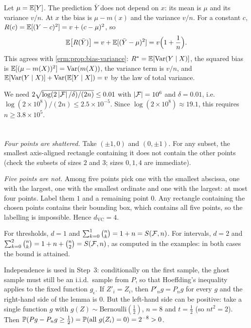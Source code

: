 Let $\mu = \mathbb{E}[Y]$. The prediction $\bar Y$ does not depend on $x$: its mean is
$\mu$ and its variance $v/n$. At $x$ the bias is $\mu - m(x)$ and the variance
$v/n$. For a constant $c$, $R(c) = \mathbb{E}[(Y-c)^2] = v + (c-\mu)^2$, so
\[
  \mathbb{E}\bigl[R(\bar Y)\bigr] = v + \mathbb{E}[(\bar Y - \mu)^2] = v\Bigl(1 + \frac1n\Bigr).
\]
This agrees with \cref{erm:prop:bias-variance}: $R^* = \mathbb{E}[\operatorname{Var}(Y\mid X)]$, the
squared bias is $\mathbb{E}[(\mu - m(X))^2] = \operatorname{Var}(m(X))$, the variance term is $v/n$,
and $\mathbb{E}[\operatorname{Var}(Y\mid X)] + \operatorname{Var}(\mathbb{E}[Y\mid X]) = v$ by the law of total variance.

We need $2\sqrt{\log(2\left|\mathcal{F}\right|/\delta)/(2n)}\leq0.01$ with $\left|\mathcal{F}\right| = 10^6$ and
$\delta = 0.01$, i.e.\ $\log(2\times10^8)/(2n)\leq2.5\times10^{-5}$. Since
$\log(2\times10^8)\approx19.1$, this requires $n\geq 3.8\times10^5$.

\section{}

\emph{Four points are shattered.} Take $(\pm1,0)$ and $(0,\pm1)$. For any subset,
the smallest axis-aligned rectangle containing it does not contain the other
points (check the subsets of sizes $2$ and $3$; sizes $0,1,4$ are immediate).

\emph{Five points are not.} Among five points pick one with the smallest
abscissa, one with the largest, one with the smallest ordinate and one with the
largest: at most four points. Label them $1$ and a remaining point $0$. Any
rectangle containing the chosen points contains their bounding box, which
contains all five points, so the labelling is impossible. Hence
$d_{\mathrm{VC}} = 4$.

For thresholds, $d=1$ and $\sum_{k=0}^1\binom nk = 1 + n = S(\mathcal{F},n)$. For
intervals, $d = 2$ and $\sum_{k=0}^2\binom nk = 1 + n + \binom n2 = S(\mathcal{F},n)$, as
computed in the examples: in both cases the bound is attained.

Independence is used in Step~3: conditionally on the first sample, the ghost
sample must still be an i.i.d.\ sample from $P$, so that Hoeffding's inequality
applies to the fixed function $g_\epsilon$. If $Z'_i = Z_i$, then
$P'_ng = P_ng$ for every $g$ and the right-hand side of the lemma is $0$. But the
left-hand side can be positive: take a single function $g$ with
$g(Z)\sim\mathrm{Bernoulli}(\frac12)$, $n = 8$ and $t = \frac12$ (so $nt^2 = 2$).
Then $\mathbb{P}(Pg - P_ng\geq\frac12) = \mathbb{P}(\text{all } g(Z_i) = 0) = 2^{-8} > 0$.

